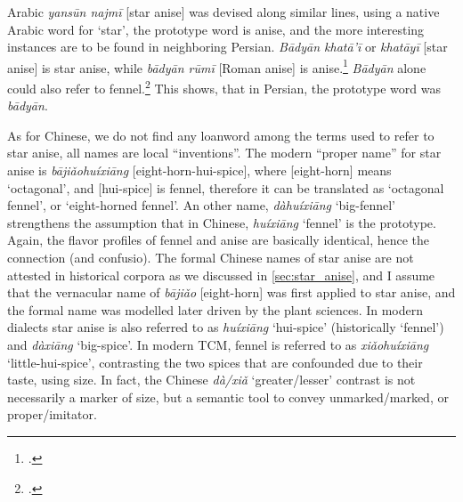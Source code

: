 Arabic \textit{yansūn najmī} [star anise] was devised along similar lines, using a native Arabic word for `star', the prototype word is anise, and the more interesting instances are to be found in neighboring Persian. \textit{Bādyān khatā'ī} or \textit{khatāyī} [star anise] is star anise, while \textit{bādyān rūmī} [Roman anise] is anise.\footcite[Vol. 1, p. 197]{hayyim_new_1934} \textit{Bādyān} alone could also refer to fennel.\footcite[140]{steingass_comprehensive_1892} This shows, that in Persian, the prototype word was \textit{bādyān}. 

As for Chinese, we do not find any loanword among the terms used to refer to star anise, all names are local ``inventions''. The modern ``proper name'' for star anise is \textit{bājiǎohuíxiāng} [eight-horn-hui-spice], where [eight-horn] means `octagonal', and [hui-spice] is fennel, therefore it can be translated as `octagonal fennel', or `eight-horned fennel'. An other name, \textit{dàhuíxiāng} `big-fennel' strengthens the assumption that in Chinese, \textit{huíxiāng} `fennel' is the prototype. Again, the flavor profiles of fennel and anise are basically identical, hence the connection (and confusio). The formal Chinese names of star anise are not attested in historical corpora as we discussed in \cref{sec:star_anise}, and I assume that the vernacular name of \textit{bājiǎo} [eight-horn] was first applied to star anise, and the formal name was modelled later driven by the plant sciences. In modern dialects star anise is also referred to as \textit{huíxiāng} `hui-spice' (historically `fennel') and \textit{dàxiāng} `big-spice'. In modern \gls{TCM}, fennel is referred to as \textit{xiǎohuíxiāng} `little-hui-spice', contrasting the two spices that are confounded due to their taste, using size. In fact, the Chinese  \textit{dà/xiǎ} `greater/lesser' contrast is not necessarily a marker of size, but a semantic tool to convey unmarked/marked, or proper/imitator.



